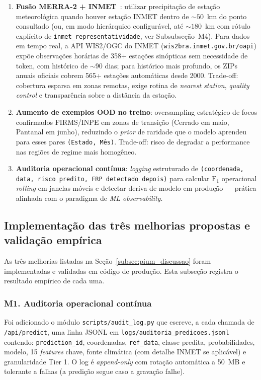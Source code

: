 \begin{enumerate}
  \item \textbf{Fusão MERRA-2 + INMET}~\cite{inmetnormais}: utilizar precipitação de estação meteorológica quando houver estação INMET dentro de $\sim 50$~km do ponto consultado (ou, em modo hierárquico configurável, até $\sim 180$~km com rótulo explícito de \texttt{inmet\_representatividade}, ver Subsubseção~M4). Para dados em tempo real, a API WIS2/OGC do INMET (\texttt{wis2bra.inmet.gov.br/oapi}) expõe observações horárias de 358+ estações sinópticas sem necessidade de token, com histórico de $\sim$90 dias; para histórico mais profundo, os ZIPs anuais oficiais cobrem 565+ estações automáticas desde 2000. Trade-off: cobertura esparsa em zonas remotas, exige rotina de \emph{nearest station}, \emph{quality control} e transparência sobre a distância da estação.
  \item \textbf{Aumento de exemplos OOD no treino}: oversampling estratégico de focos confirmados FIRMS/INPE em zonas de transição (Cerrado em maio, Pantanal em junho), reduzindo o \emph{prior} de raridade que o modelo aprendeu para esses pares \texttt{(Estado, Mês)}. Trade-off: risco de degradar a performance nas regiões de regime mais homogêneo.
  \item \textbf{Auditoria operacional contínua}: \emph{logging} estruturado de \texttt{(coordenada, data, risco predito, FRP detectado depois)} para calcular $\text{F}_1$ operacional \emph{rolling} em janelas móveis e detectar deriva de modelo em produção --- prática alinhada com o paradigma de \emph{ML observability}.
\end{enumerate}

\subsection{Implementação das três melhorias propostas e validação empírica}
\label{subsec:pium_melhorias}

As três melhorias listadas na Seção~\ref{subsec:pium_discussao} foram implementadas e validadas em código de produção. Esta subseção registra o resultado empírico de cada uma.

\subsubsection*{M1. Auditoria operacional contínua}

Foi adicionado o módulo \texttt{scripts/audit\_log.py} que escreve, a cada chamada de \texttt{/api/predict}, uma linha JSONL em \texttt{logs/auditoria\_predicoes.jsonl} contendo: \texttt{prediction\_id}, coordenadas, \texttt{ref\_data}, classe predita, probabilidades, modelo, 15 \emph{features} chave, fonte climática (com detalhe INMET se aplicável) e granularidade Tier 1. O log é \emph{append-only} com rotação automática a 50~MB e tolerante a falhas (a predição segue caso a gravação falhe).

